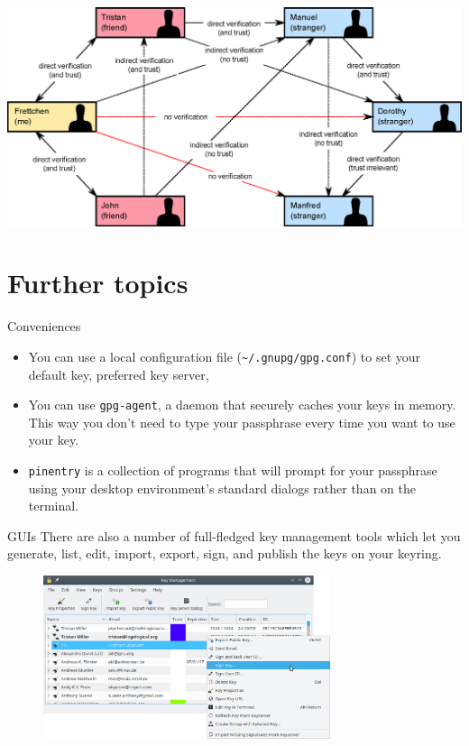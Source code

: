 \documentclass[
mode=present,
paper=smartboard,
size=20pt,
]{powerdot}
\begin{document}
\begin{slide}[toc=]{}
\centering\includegraphics[width=\linewidth]{images/Web_of_Trust_2.eps}
\end{slide}

\section{Further topics}

\begin{slide}{Conveniences}
  \begin{itemize}
  \item You can use a local configuration file
    (\texttt{\textasciitilde /.gnupg/gpg.conf}) to set your default
    key, preferred key server, \etc
  \item You can use \texttt{gpg-agent}, a daemon that securely caches
    your keys in memory. This way you don't need to type your
    passphrase every time you want to use your key.
  \item \texttt{pinentry} is a collection of programs that will prompt
    for your passphrase using your desktop environment's standard
    dialogs rather than on the terminal.
  \end{itemize}
\end{slide}

\begin{slide}{GUIs}
  There are also a number of full-fledged key management tools which
  let you generate, list, edit, import, export, sign, and publish the
  keys on your keyring.
  \begin{figure}[H]
    \centering
    \includegraphics[width=0.75\textwidth]{images/kgpg1.eps}
    \label{fig:kgpg1}
  \end{figure}
\end{slide}
\end{document}
